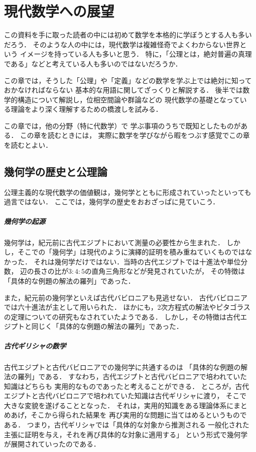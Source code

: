 \chapter{現代数学への展望}
\label{chp:gensuu}
 この資料を手に取った読者の中には初めて数学を本格的に学ぼうとする人も多いだろう．
 そのような人の中には，現代数学は複雑怪奇でよくわからない世界という
 イメージを持っている人も多いと思う．
 特に，「公理とは，絶対普遍の真理である」などと考えている人も多いのではないだろうか．

 この章では，そうした「公理」や「定義」などの数学を学ぶ上では絶対に知っておかなければならない
 基本的な用語に関してざっくりと解説する．
 後半では数学的構造について解説し，位相空間論や群論などの
 現代数学の基礎となっている理論をより深く理解するための橋渡しを試みる．

 この章では，他の分野（特に代数学）で
 学ぶ事項のうちで既知としたものがある．
 この章を読むときには，
 実際に数学を学びながら暇をつぶす感覚でこの章を読むとよい．

 \newpage

 \section{幾何学の歴史と公理論}
 \label{sec:kikakouri}
  公理主義的な現代数学の価値観は，幾何学とともに形成されていったといっても過言ではない．
  ここでは，幾何学の歴史をおおざっぱに見ていこう．

 \paragraph{幾何学の起源}
  幾何学は，紀元前に古代エジプトにおいて測量の必要性から生まれた．
  しかし，そこでの「幾何学」は現代のように演繹的証明を積み重ねていくものではなかった．
  それは幾何学だけではない．当時の古代エジプトでは十進法や単位分数，
  辺の長さの比が$3:4:5$の直角三角形などが発見されていたが，
  その特徴は「具体的な例題の解法の羅列」であった．

  また，紀元前の幾何学といえば古代バビロニアも見逃せない．
  古代バビロニアでは六十進法が主として用いられた．
  ほかにも，2次方程式の解法やピタゴラスの定理についての研究もなされていたようである．
  しかし，その特徴は古代エジプトと同じく「具体的な例題の解法の羅列」であった．

 \paragraph{古代ギリシャの数学}
  古代エジプトと古代バビロニアでの幾何学に共通するのは
  「具体的な例題の解法の羅列」である．
  すなわち，古代エジプトと古代バビロニアで培われていた知識はどちらも
  実用的なものであったと考えることができる．
  ところが，古代エジプトと古代バビロニアで培われていた知識は古代ギリシャに渡り，
  そこで大きな変貌を遂げることとなった．
  それは，実用的知識をある理論体系にまとめあげ，そこから得られた結果を
  再び実用的な問題に当てはめるというものである．
  つまり，古代ギリシャでは「具体的な対象から推測される
  一般化された主張に証明を与え，それを再び具体的な対象に適用する」
  という形式で幾何学が展開されていったのである．

